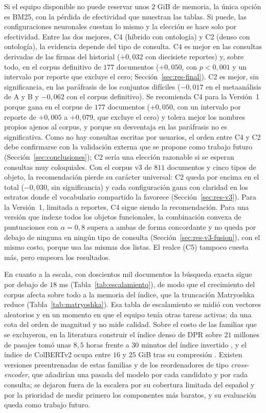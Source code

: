 \documentclass[11pt,letterpaper]{article}
\numberwithin{equation}{section}
\begin{document}
Si el equipo disponible no puede reservar unos $2$ GiB de memoria, la única opción es BM25, con la pérdida de efectividad que muestran las tablas. Si puede, las configuraciones neuronales cuestan lo mismo y la elección se hace solo por efectividad. Entre las dos mejores, C4 (híbrido con ontología) y C2 (denso con ontología), la evidencia depende del tipo de consulta. C4 es mejor en las consultas derivadas de las firmas del historial ($+0{,}032$ con diecisiete reportes) y, sobre todo, en el corpus definitivo de $177$ documentos ($+0{,}050$, con $p<0{,}001$ y un intervalo por reporte que excluye el cero; Sección~\ref{sec:res-final}). C2 es mejor, sin significancia, en las paráfrasis de los conjuntos difíciles ($-0{,}017$ en el metaanálisis de A y B y $-0{,}062$ con el corpus definitivo). Se recomienda C4 para la Versión~1 porque gana en el corpus de $177$ documentos ($+0{,}050$, con un intervalo por reporte de $+0{,}005$ a $+0{,}079$, que excluye el cero) y tolera mejor los nombres propios ajenos al corpus, y porque su desventaja en las paráfrasis no es significativa. Como no hay consultas escritas por usuarios, el orden entre C4 y C2 debe confirmarse con la validación externa que se propone como trabajo futuro (Sección~\ref{sec:conclusiones}); C2 sería una elección razonable si se esperan consultas muy coloquiales. Con el corpus v3 de $811$ documentos y cinco tipos de objeto, la recomendación pierde su carácter universal: C2 queda por encima en el total ($-0{,}030$, sin significancia) y cada configuración gana con claridad en los estratos donde el vocabulario compartido la favorece (Sección~\ref{sec:res-v3}). Para la Versión~1, limitada a reportes, C4 sigue siendo la recomendación. Para una versión que indexe todos los objetos funcionales, la combinación convexa de puntuaciones con $\alpha=0{,}8$ supera a ambas de forma concordante y no queda por debajo de ninguna en ningún tipo de consulta (Sección~\ref{sec:res-v3-fusion}), con el mismo costo, porque usa las mismas dos listas. El realce (C5) tampoco cuesta más, pero empeora los resultados.

En cuanto a la escala, con doscientos mil documentos la búsqueda exacta sigue por debajo de $18$ ms (Tabla~\ref{tab:escalamiento}), de modo que el crecimiento del corpus afecta sobre todo a la memoria del índice, que la truncación Matryoshka reduce (Tabla~\ref{tab:matryoshka}). Esa tabla de escalamiento se midió con vectores aleatorios y en un momento en que el equipo tenía otras tareas activas; da una cota del orden de magnitud y no mide calidad. Sobre el costo de las familias que se excluyeron, en la literatura construir el índice denso de DPR sobre $21$ millones de pasajes tomó unas $8{,}5$ horas frente a $30$ minutos del índice invertido \cite{karpukhin2020dpr}, y el índice de ColBERTv2 ocupa entre $16$ y $25$ GiB tras su compresión \cite{santhanam2022colbertv2}. Existen versiones preentrenadas de estas familias y de los reordenadores de tipo \textit{cross-encoder}, que añadirían una pasada del modelo por cada candidato y por cada consulta; se dejaron fuera de la escalera por su cobertura limitada del español y por la prioridad de medir primero los componentes más baratos, y su evaluación queda como trabajo futuro.
\end{document}

